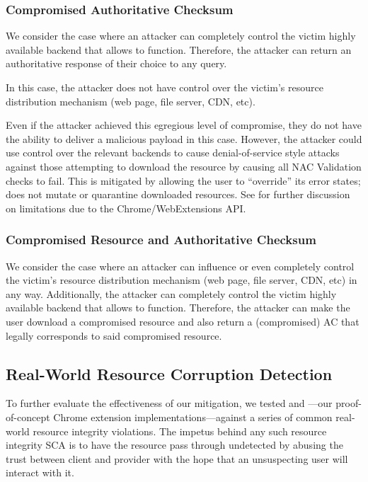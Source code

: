 \subsubsection{Compromised Authoritative Checksum}

We consider the case where an attacker can completely control the victim highly
available backend that allows \SYSTEM{} to function. Therefore, the attacker can
return an authoritative response of their choice to any query.

In this case, the attacker does not have control over the victim's resource
distribution mechanism (web page, file server, CDN, etc).

Even if the attacker achieved this egregious level of compromise, they do not
have the ability to deliver a malicious payload in this case. However, the
attacker could use control over the relevant backends to cause denial-of-service
style attacks against those attempting to download the resource by causing all
NAC Validation checks to fail. This is mitigated by \SYSTEM{} allowing the user
to ``override'' its error states; \ie \SYSTEM{} does not mutate or quarantine
downloaded resources. See  for further discussion on
limitations due to the Chrome/WebExtensions API.

\subsubsection{Compromised Resource and Authoritative Checksum}

We consider the case where an attacker can influence or even completely control
the victim's resource distribution mechanism (web page, file server, CDN, etc)
in any way. Additionally, the attacker can completely control the victim highly
available backend that allows \SYSTEM{} to function. Therefore, the attacker can
make the user download a compromised resource and also return a (compromised) AC
that legally corresponds to said compromised resource.

\subsection{Real-World Resource Corruption Detection}

To further evaluate the effectiveness of our mitigation, we tested \DNSSYS{} and
\DHTSYS{}---our proof-of-concept \SYSTEM{} Chrome extension
implementations---against a series of common real-world resource integrity
violations. The impetus behind any such resource integrity SCA is to have the
resource pass through undetected by abusing the trust between client and
provider with the hope that an unsuspecting user will interact with it.

